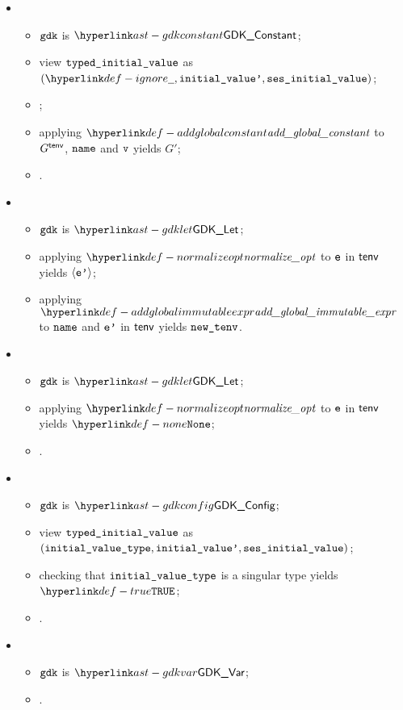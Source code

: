 \ProseParagraph
\OneApplies
\begin{itemize}
  \item {}
  \begin{itemize}
    \item $\texttt{gdk}$ is $\GDKConstant$;
    \item view $\texttt{typed\_initial\_value}$ as $(\Ignore, \initialvaluep, \vsesinitialvalue)$;
    \item \Prosestaticeval{$\tenv$}{$\initialvaluep$}{$\vv$};
    \item applying $\addglobalconstant$ to $G^{\textsf{tenv}}$, $\texttt{name}$ and $\vv$ yields $G'$;
    \item {}.
  \end{itemize}

  \item {}
  \begin{itemize}
    \item $\texttt{gdk}$ is $\GDKLet$;
    \item applying $\normalizeopt$ to $\texttt{e}$ in $\tenv$ yields $\langle\texttt{e'}\rangle$\ProseOrTypeError;
    \item applying $\addglobalimmutableexpr$ to $\texttt{name}$ and $\texttt{e'}$ in $\tenv$ yields $\newtenv$.
  \end{itemize}

  \item {}
  \begin{itemize}
    \item $\texttt{gdk}$ is $\GDKLet$;
    \item applying $\normalizeopt$ to $\texttt{e}$ in $\tenv$ yields $\None$\ProseOrTypeError;
    \item \Proseeqdef{$\newtenv$}{$\tenv$}.
  \end{itemize}

  \item {}
  \begin{itemize}
    \item $\texttt{gdk}$ is $\GDKConfig$;
    \item view $\texttt{typed\_initial\_value}$ as \\ $(\texttt{initial\_value\_type}, \texttt{initial\_value'}, \texttt{ses\_initial\_value})$;
    \item checking that $\texttt{initial\_value\_type}$ is a singular type yields $\True$\ProseOrTypeError;
    \item \Proseeqdef{$\newtenv$}{$\tenv$}.
  \end{itemize}

  \item {}
  \begin{itemize}
    \item $\texttt{gdk}$ is $\GDKVar$;
    \item \Proseeqdef{$\newtenv$}{$\tenv$}.
  \end{itemize}
\end{itemize}

